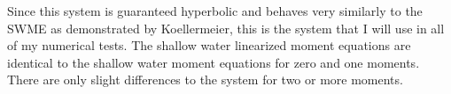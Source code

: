   Since this system is guaranteed hyperbolic and behaves very similarly to the SWME as
  demonstrated by Koellermeier, this is the system that I will use in all of my
  numerical tests.
  The shallow water linearized moment equations are identical to the shallow water
  moment equations for zero and one moments.
  There are only slight differences to the system for two or more moments.




